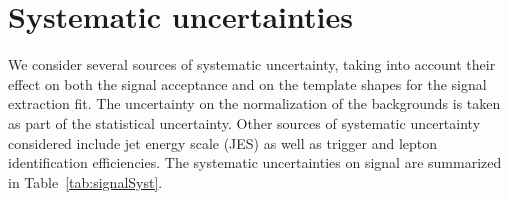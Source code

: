 \clearpage{}
\section{Systematic uncertainties}
\label{sec:syst}
We consider several sources of systematic uncertainty, taking into
account their effect on both the signal acceptance and on the template
shapes for the signal extraction fit.  The uncertainty on the
normalization of the backgrounds is taken as part of the statistical
uncertainty.  Other sources of
systematic uncertainty considered include jet energy scale (JES) as
well as trigger and lepton identification efficiencies.
The systematic uncertainties on signal are summarized in
Table~\ref{tab:signalSyst}.


